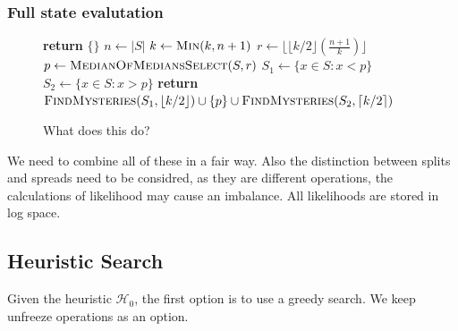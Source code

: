 \documentclass[12pt,a4paper,twoside,openright]{report}
\theoremstyle{definition}
\begin{document}
\FloatBarrier
\subsubsection{Full state evalutation}

\begin{figure}[h]
    \caption{What does this do?}

    \label{code:mystery}

    \begin{algorithmic}[1]
          \State \textbf{return} $\{\}$ 
        \EndIf
        \State $n \gets |S|$ 
        \State $k \gets \Call{Min}{k, n + 1}$ 
        \State $r\gets \lfloor \lfloor k/2 \rfloor (\tfrac{n+1}{k}) \rfloor$ 
        \State $p \gets \Call{MedianOfMediansSelect}{S, r}$ 
        \State $S_1 \gets \{ x \in S : x < p \}$
        \State $S_2 \gets \{ x \in S : x > p \}$
        \State \textbf{return} $\Call{FindMysteries}{S_1, \lfloor k/2 \rfloor} \cup\{ p \} \cup \Call{FindMysteries}{S_2, \lceil k/2 \rceil}$
      \EndFunction
    \end{algorithmic}

  \end{figure}


We need to combine all of these in a fair way. Also the distinction between splits and spreads need to be considred, as they are different operations, the calculations of likelihood may cause an imbalance. All likelihoods are stored in log space.

\FloatBarrier
\subsection{Heuristic Search}
Given the heuristic $\mathcal{H}_0$, the first option is to use a greedy search.
We keep unfreeze operations as an option.
\end{document}
